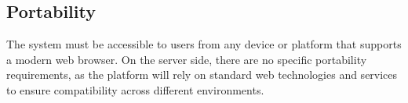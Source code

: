 \subsection{Portability}
\label{subsec:portability}%


The system must be accessible to users from any device or platform that
supports a modern web browser. On the server side, there are no specific 
portability requirements, as the platform will rely on standard web 
technologies and services to ensure compatibility across different environments.